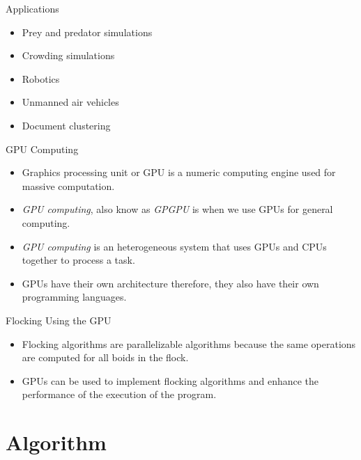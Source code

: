 \documentclass[red]{beamer}
\begin{document}
\begin{frame}{Applications}
	\begin{itemize}
		\pause \item Prey and predator simulations
		\pause \item Crowding simulations
		\pause \item Robotics
		\pause \item Unmanned air vehicles
		\pause \item Document clustering
	\end{itemize}
\end{frame}

\begin{frame}{GPU Computing}
	\begin{itemize}
		\pause \item Graphics processing unit or GPU is a numeric computing engine used for massive computation.
		\pause \item \textit{GPU computing}, also know as \textit{GPGPU} is when we use GPUs for general computing.
		\pause \item \textit{GPU computing} is an heterogeneous system that uses GPUs and CPUs together to process a task.
		\pause \item GPUs have their own architecture therefore, they also have their own programming languages.
	\end{itemize}
\end{frame}

\begin{frame}{Flocking Using the GPU}
	\begin{itemize}
		\pause \item Flocking algorithms are parallelizable algorithms because the same operations are computed for all boids in the flock.
		\pause \item GPUs can be used to implement flocking algorithms and enhance the performance of the execution of the program.
	\end{itemize}
\end{frame}

\section{Algorithm}
\end{document}
